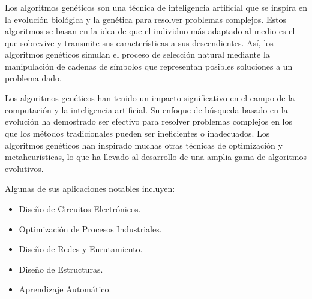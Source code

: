 Los algoritmos genéticos son una técnica de inteligencia artificial que se inspira en la evolución biológica y la genética para resolver problemas complejos. Estos algoritmos se basan en la idea de que el individuo más adaptado al medio es el que sobrevive y transmite sus características a sus descendientes. Así, los algoritmos genéticos simulan el proceso de selección natural mediante la manipulación de cadenas de símbolos que representan posibles soluciones a un problema dado.

Los algoritmos genéticos han tenido un impacto significativo en el campo de la computación y la inteligencia artificial. Su enfoque de búsqueda basado en la evolución ha demostrado ser efectivo para resolver problemas complejos en los que los métodos tradicionales pueden ser ineficientes o inadecuados. Los algoritmos genéticos han inspirado muchas otras técnicas de optimización y metaheurísticas, lo que ha llevado al desarrollo de una amplia gama de algoritmos evolutivos.

Algunas de sus aplicaciones notables incluyen:

\begin{itemize}
	\item Diseño de Circuitos Electrónicos.
	\item Optimización de Procesos Industriales.
	\item Diseño de Redes y Enrutamiento.
	\item Diseño de Estructuras.
	\item Aprendizaje Automático.
\end{itemize}
